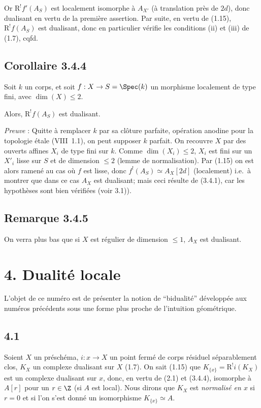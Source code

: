 Or $\mathrm{R}^{!}f'(A_S)$ est localement isomorphe à $A_{X'}$ (à translation près de $2d$), donc dualisant en vertu de la première assertion. Par suite, en vertu de (1.15), $\mathrm{R}^{!}f(A_S)$ est dualisant, donc en particulier vérifie les conditions (ii) et (iii) de (1.7), cqfd.

\subsection*{Corollaire 3.4.4}
Soit $k$ un corps, et soit $f : X \to S = \Spec(k)$ un morphisme localement de type fini, avec $\dim(X) \leqslant 2$.

Alors, $\mathrm{R}^{!}f(A_S)$ est dualisant.

\emph{Preuve} : Quitte à remplacer $k$ par sa clôture parfaite, opération anodine pour la topologie étale (VIII~1.1), on peut supposer $k$ parfait. On recouvre $X$ par des ouverts affines $X_i$ de type fini sur $k$. Comme $\dim(X_i) \leqslant 2$, $X_i$ est fini sur un $X'_i$ lisse sur $S$ et de dimension $\leqslant 2$ (lemme de normalisation). Par (1.15) on est alors ramené au cas où $f$ est lisse, donc $f^{!}(A_S) \simeq A_X[2d]$ (localement) i.e.~à montrer que dans ce cas $A_X$ est dualisant; mais ceci résulte de (3.4.1), car les hypothèses sont bien vérifiées (voir 3.1)).

\subsection*{Remarque 3.4.5}
On verra plus bas que si $X$ est régulier de dimension $\leqslant 1$, $A_X$ est dualisant.

\section*{4. Dualité locale}

L'objet de ce numéro est de présenter la notion de ``bidualité'' développée aux numéros précédents sous une forme plus proche de l'intuition géométrique.

\subsection*{4.1}
Soient $X$ un préschéma, $i:x\to X$ un point fermé de corps résiduel séparablement clos, $K_X$ un complexe dualisant sur $X$ (1.7). On sait (1.15) que $K_{\{x\}}=\mathrm{R}^{!}i(K_X)$ est un complexe dualisant sur $x$, donc, en vertu de (2.1) et (3.4.4), isomorphe à $A[r]$ pour un $r\in\Z$ (si $A$ est local). Nous dirons que $K_X$ est \emph{normalisé en $x$} si $r=0$ et si l'on s'est donné un isomorphisme $K_{\{x\}}\simeq A$.

